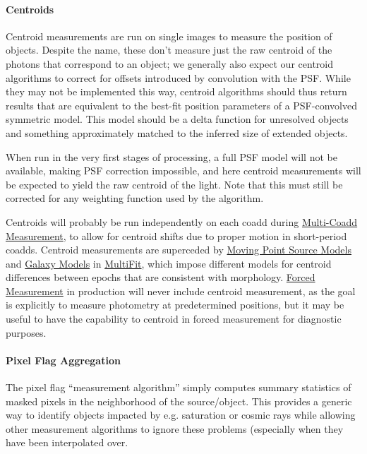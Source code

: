\paragraph{Centroids}
\label{sec:acCentroidAlgorithms}

Centroid measurements are run on single images to measure the position of objects.  Despite the name, these don't measure just the raw centroid of the photons that correspond to an object; we generally also expect our centroid algorithms to correct for offsets introduced by convolution with the PSF.
While they may not be implemented this way, centroid algorithms should thus return results that are equivalent to the best-fit position parameters of a PSF-convolved symmetric model.  This model should be a delta function for unresolved objects and something approximately matched to the inferred size of extended objects.

When run in the very first stages of processing, a full PSF model will not be available, making PSF correction impossible, and here centroid measurements will be expected to yield the raw centroid of the light.  Note that this must still be corrected for any weighting function used by the algorithm.

Centroids will probably be run independently on each coadd during \hyperref[sec:acMultiCoaddMeasurement]{Multi-Coadd Measurement}, to allow for centroid shifts due to proper motion in short-period coadds.  Centroid measurements are superceded by \hyperref[sec:acMovingPointSourceModels]{Moving Point Source Models} and \hyperref[sec:acGalaxyModels]{Galaxy Models} in \hyperref[drpMultiFit]{MultiFit}, which impose different models for centroid differences between epochs that are consistent with morphology.  \hyperref[sec:ForcedMeasurement]{Forced Measurement} in production will never include centroid measurement, as the goal is explicitly to measure photometry at predetermined positions, but it may be useful to have the capability to centroid in forced measurement for diagnostic purposes.

\paragraph{Pixel Flag Aggregation}
\label{sec:acPixelFlags}

The pixel flag ``measurement algorithm'' simply computes summary statistics of masked pixels in the neighborhood of the source/object.  This provides a generic way to identify objects impacted by e.g. saturation or cosmic rays while allowing other measurement algorithms to ignore these problems (especially when they have been interpolated over.


